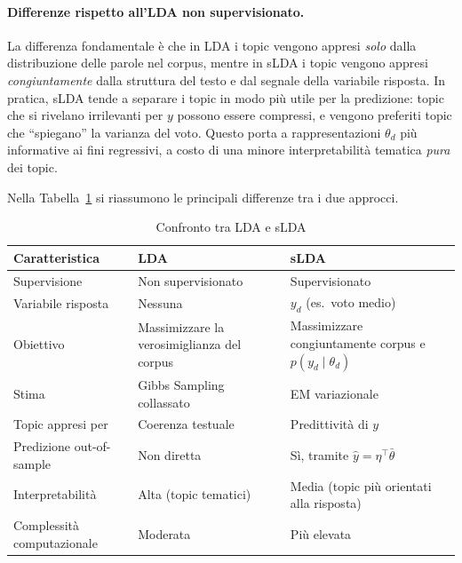 \documentclass[12pt, a4paper]{article}
\begin{document}
\paragraph{Differenze rispetto all'LDA non supervisionato.}
La differenza fondamentale è che in LDA i topic vengono appresi
\emph{solo} dalla distribuzione delle parole nel corpus, mentre
in sLDA i topic vengono appresi \emph{congiuntamente} dalla
struttura del testo e dal segnale della variabile risposta.
In pratica, sLDA tende a separare i topic in modo più utile
per la predizione: topic che si rivelano irrilevanti per $y$
possono essere compressi, e vengono preferiti topic che
``spiegano'' la varianza del voto.
Questo porta a rappresentazioni $\theta_d$ più informative ai
fini regressivi, a costo di una minore interpretabilità tematica
\emph{pura} dei topic.

Nella Tabella~\ref{tab:lda_vs_slda} si riassumono le principali
differenze tra i due approcci.

\begin{table}[H]
\centering
\caption{Confronto tra LDA e sLDA}
\label{tab:lda_vs_slda}
\smallskip
\begin{tabular}{@{}p{4.2cm}p{4.5cm}p{4.5cm}@{}}
\toprule
\textbf{Caratteristica} & \textbf{LDA} & \textbf{sLDA} \\
\midrule
Supervisione            & Non supervisionato & Supervisionato \\
Variabile risposta      & Nessuna       & $y_d$ (es.\ voto medio) \\
Obiettivo               & Massimizzare la verosimiglianza del corpus & Massimizzare congiuntamente corpus e $p(y_d \mid \theta_d)$ \\
Stima                   & Gibbs Sampling collassato & EM variazionale \\
Topic appresi per       & Coerenza testuale & Predittività di $y$ \\
Predizione out-of-sample & Non diretta & Sì, tramite $\hat{y} = \eta^\top \bar{\theta}$ \\
Interpretabilità        & Alta (topic tematici) & Media (topic più orientati alla risposta) \\
Complessità computazionale & Moderata   & Più elevata \\
\bottomrule
\end{tabular}
\end{table}
\end{document}

